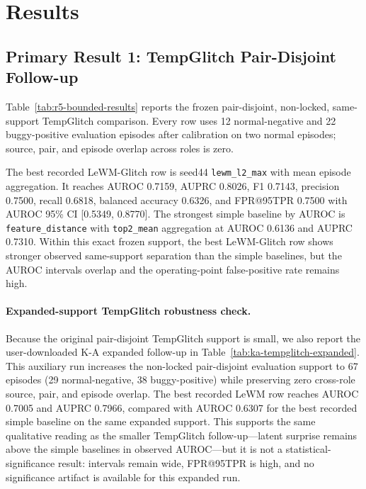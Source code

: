 \section{Results}
\label{sec:results}

\subsection{Primary Result 1: TempGlitch Pair-Disjoint Follow-up}

Table~\ref{tab:r5-bounded-results} reports the frozen pair-disjoint, non-locked, same-support
TempGlitch comparison. Every row uses 12 normal-negative and 22 buggy-positive evaluation
episodes after calibration on two normal episodes; source, pair, and episode overlap across roles
is zero.



The best recorded LeWM-Glitch row is seed44 \texttt{lewm\_l2\_max} with mean episode aggregation.
It reaches AUROC 0.7159, AUPRC 0.8026, F1 0.7143, precision 0.7500, recall 0.6818, balanced
accuracy 0.6326, and FPR@95TPR 0.7500 with AUROC 95\% CI [0.5349, 0.8770]. The strongest simple
baseline by AUROC is \texttt{feature\_distance} with \texttt{top2\_mean} aggregation at
AUROC 0.6136 and AUPRC 0.7310. Within this exact frozen support, the best LeWM-Glitch row shows
stronger observed same-support separation than the simple baselines, but the AUROC intervals
overlap and the operating-point false-positive rate remains high.

\paragraph{Expanded-support TempGlitch robustness check.}
Because the original pair-disjoint TempGlitch support is small, we also report the user-downloaded
K-A expanded follow-up in Table~\ref{tab:ka-tempglitch-expanded}. This auxiliary run increases the
non-locked pair-disjoint evaluation support to 67 episodes (29 normal-negative, 38
buggy-positive) while preserving zero cross-role source, pair, and episode overlap. The best
recorded LeWM row reaches AUROC 0.7005 and AUPRC 0.7966, compared with AUROC 0.6307 for the best
recorded simple baseline on the same expanded support. This supports the same qualitative reading
as the smaller TempGlitch follow-up---latent surprise remains above the simple baselines in
observed AUROC---but it is not a statistical-significance result: intervals remain wide, FPR@95TPR
is high, and no significance artifact is available for this expanded run.

